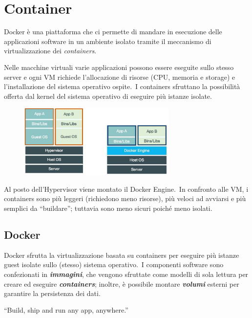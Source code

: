 \section{Container}

Docker è una piattaforma che ci permette di mandare in esecuzione delle applicazioni software in un ambiente isolato tramite il meccanismo di virtualizzazione dei \textit{containers}.

Nelle macchine virtuali varie applicazioni possono essere eseguite sullo stesso server e ogni VM richiede l'allocazione di risorse (CPU, memoria e storage) e l'installazione del sistema operativo ospite.\
I containers sfruttano la possibilità offerta dal kernel del sistema operativo di eseguire più istanze isolate.\

\begin{figure}[H]
    \centering
    \includegraphics[width=0.7\textwidth]{immagini/Docker_VM.png}
\end{figure}
\noindent Al posto dell'Hypervisor viene montato il Docker Engine.\
In confronto alle VM, i containers sono più leggeri (richiedono meno risorse), più veloci ad avviarsi e più semplici da ``buildare''; tuttavia sono meno sicuri poiché meno isolati.

\subsection{Docker}

Docker sfrutta la virtualizzazione basata su containers per eseguire più istanze guest isolate sullo (stesso) sistema operativo.\
I componenti software sono confezionati in \textbf{\textit{immagini}}, che vengono sfruttate come modelli di sola lettura per creare ed eseguire \textbf{\textit{containers}}; inoltre, è possibile montare \textbf{\textit{volumi}} esterni per garantire la persistenza dei dati.\

\begin{center}
    ``Build, ship and run any app, anywhere.''
\end{center}

